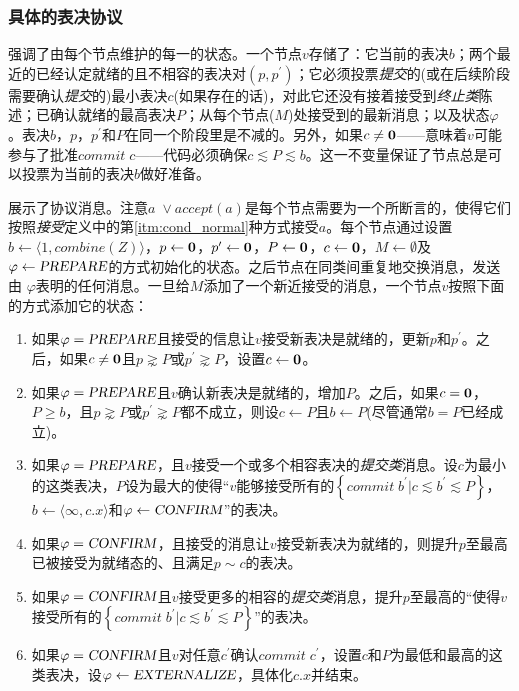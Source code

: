 \subsubsection{具体的表决协议}\label{sec:scp_ballot_concrete}

强调了由每个节点维护的每一{\slot}的状态。一个节点$v$存储了：它当前的表决$b$；两个最近的已经认定就绪的且不相容的表决对$(p,p^{\prime})$；它必须投票\textit{提交}的(或在后续阶段需要确认\textit{提交}的)最小表决$c$(如果存在的话)，对此它还没有接着接受到\textit{终止类}陈述；已确认就绪的最高表决$P$；从每个节点($M$)处接受到的最新消息；以及状态$\varphi$。表决$b$，$p$，$p^{\prime}$和$P$在同一个阶段里是不减的。另外，如果$c\neq{\bm 0}$——意味着$v$可能参与了批准$commit\;c$——代码必须确保$c\lesssim P\lesssim b$。这一不变量保证了节点总是可以投票为当前的表决$b$做好准备。

展示了协议消息。注意$a\;\vee accept(a)$是每个节点需要为一个{\quorum}所断言的，使得它们按照\textit{接受}定义中的第\ref{itm:cond_normal}种方式接受$a$。每个节点通过设置$b\leftarrow \langle 1,combine(Z)\rangle$，$p\leftarrow {\bm 0}$，$p^{\prime}\leftarrow {\bm 0}$，$P\leftarrow {\bm 0}$，$c\leftarrow {\bm 0}$，$M\leftarrow\emptyset$及$\varphi \leftarrow \textsl{PREPARE}$的方式初始化{\slot}的状态。之后节点在同类间重复地交换消息，发送由 $\varphi$表明的任何消息。一旦给$M$添加了一个新近接受的消息，一个节点$v$按照下面的方式添加它的状态：

\begin{enumerate}\label{protocal_case}
	\item 如果$\varphi = \textsl{PREPARE}$且接受的信息让$v$接受新表决是就绪的，更新$p$和$p^{\prime}$。之后，如果$c\neq {\bm 0}$且$p\gnsim P$或$p^{\prime}\gnsim P$，设置$c\leftarrow {\bm 0}$。
	\item 如果$\varphi = \textsl{PREPARE}$且$v$确认新表决是就绪的，增加$P$。之后，如果$c={\bm 0}$，$P\geq b$，且$p\gnsim P$或$p^{\prime}\gnsim P$都不成立，则设$c\leftarrow P$且$b\leftarrow P$(尽管通常$b=P$已经成立)。
	\item 如果$\varphi = \textsl{PREPARE}$，且$v$接受一个或多个相容表决的\textit{提交类}消息。设$c$为最小的这类表决，$P$设为最大的使得``$v$能够接受所有的$\left\{commit\;b^{\prime}|c\lesssim b^{\prime}\lesssim P\right\}$，$b\leftarrow \langle \infty, c.x\rangle$和$\varphi\leftarrow \textsl{CONFIRM}$''的表决。
	\item 如果$\varphi = \textsl{CONFIRM}$，且接受的消息让$v$接受新表决为就绪的，则提升$p$至最高已被接受为就绪态的、且满足$p\sim c$的表决。
	\item 如果$\varphi = \textsl{CONFIRM}$且$v$接受更多的相容的\textit{提交类}消息，提升$p$至最高的``使得$v$接受所有的$\left\{commit\;b^{\prime}|c\lesssim b^{\prime} \lesssim P\right\}$''的表决。
	\item 如果$\varphi = \textsl{CONFIRM}$且$v$对任意$c^{\prime}$确认$commit\;c^{\prime}$，设置$c$和$P$为最低和最高的这类表决，设$\varphi\leftarrow\textsl{EXTERNALIZE}$，具体化$c.x$并结束。
\end{enumerate}

